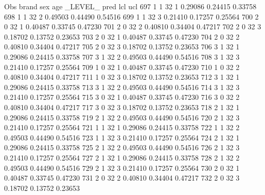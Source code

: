 \documentclass{article}
\begin{document}
\begin{Woutput}
 Obs    brand    sex    age    _LEVEL_      pred       lcl        ucl
 697      1       1      32       1       0.29086    0.24415    0.33758
 698      1       1      32       2       0.49503    0.44490    0.54516
 699      1       1      32       3       0.21410    0.17257    0.25564
 700      2       0      32       1       0.40487    0.33745    0.47230
 701      2       0      32       2       0.40810    0.34404    0.47217
 702      2       0      32       3       0.18702    0.13752    0.23653
 703      2       0      32       1       0.40487    0.33745    0.47230
 704      2       0      32       2       0.40810    0.34404    0.47217
 705      2       0      32       3       0.18702    0.13752    0.23653
 706      3       1      32       1       0.29086    0.24415    0.33758
 707      3       1      32       2       0.49503    0.44490    0.54516
 708      3       1      32       3       0.21410    0.17257    0.25564
 709      1       0      32       1       0.40487    0.33745    0.47230
 710      1       0      32       2       0.40810    0.34404    0.47217
 711      1       0      32       3       0.18702    0.13752    0.23653
 712      3       1      32       1       0.29086    0.24415    0.33758
 713      3       1      32       2       0.49503    0.44490    0.54516
 714      3       1      32       3       0.21410    0.17257    0.25564
 715      3       0      32       1       0.40487    0.33745    0.47230
 716      3       0      32       2       0.40810    0.34404    0.47217
 717      3       0      32       3       0.18702    0.13752    0.23653
 718      2       1      32       1       0.29086    0.24415    0.33758
 719      2       1      32       2       0.49503    0.44490    0.54516
 720      2       1      32       3       0.21410    0.17257    0.25564
 721      1       1      32       1       0.29086    0.24415    0.33758
 722      1       1      32       2       0.49503    0.44490    0.54516
 723      1       1      32       3       0.21410    0.17257    0.25564
 724      2       1      32       1       0.29086    0.24415    0.33758
 725      2       1      32       2       0.49503    0.44490    0.54516
 726      2       1      32       3       0.21410    0.17257    0.25564
 727      2       1      32       1       0.29086    0.24415    0.33758
 728      2       1      32       2       0.49503    0.44490    0.54516
 729      2       1      32       3       0.21410    0.17257    0.25564
 730      2       0      32       1       0.40487    0.33745    0.47230
 731      2       0      32       2       0.40810    0.34404    0.47217
 732      2       0      32       3       0.18702    0.13752    0.23653

\end{Woutput}
\end{document}
